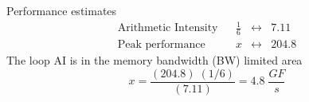 \documentclass{article}
\begin{document}
\begin{enumerate}
\begin{table}[!htp]
\begin{tabular}{|l|l|l|l|}
&                        &                                                                                      &       \\\hline
\end{tabular}
\end{table}
Performance estimates
\[\begin{array}{lcccc}
\mbox{Arithmetic Intensity}&  & \frac{1}{6} & \longleftrightarrow & 7.11\\
\mbox{Peak performance}    &  & x            & \longleftrightarrow & 204.8
  \end{array} \]
The loop AI is in the memory bandwidth (BW) limited area
\begin{equation*}
 x  = \frac{(204.8)\;(1/6)}{(7.11)} = 4.8 \;\frac{GF}{s}
\end{equation*}


\end{enumerate}
\end{document}
